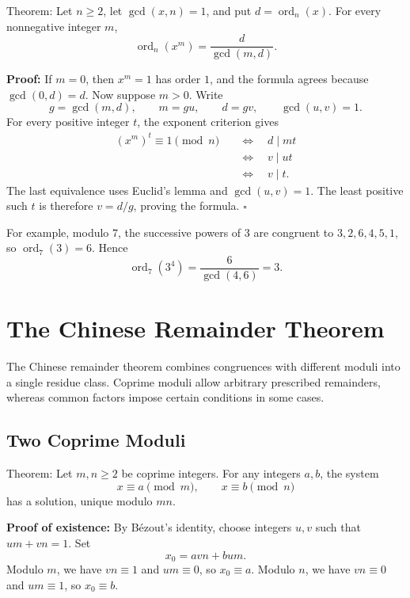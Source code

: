 \documentclass[a4paper,11pt,abstracton]{scrartcl}
\theoremstyle{dotlessP}
\theoremstyle{dotlessS}
\theoremstyle{remark}
\theoremstyle{definition}
\begin{document}
\begin{mainbox}{Theorem:}
Let $n\geq2$, let $\gcd(x,n)=1$, and put $d=\operatorname{ord}_n(x)$.
For every nonnegative integer $m$,
\[
    \boxed{\operatorname{ord}_n(x^m)=\frac{d}{\gcd(m,d)}.}
\]
\end{mainbox}

\textbf{Proof:}
If $m=0$, then $x^m=1$ has order $1$, and the formula agrees because
$\gcd(0,d)=d$. Now suppose $m>0$. Write
\[
    g=\gcd(m,d),\qquad m=gu,\qquad d=gv,
    \qquad\gcd(u,v)=1.
\]
For every positive integer $t$, the exponent criterion gives
\begin{align*}
    (x^m)^t\equiv1\pmod n
    &\quad\Longleftrightarrow\quad d\mid mt\\
    &\quad\Longleftrightarrow\quad v\mid ut\\
    &\quad\Longleftrightarrow\quad v\mid t.
\end{align*}
The last equivalence uses Euclid's lemma and $\gcd(u,v)=1$.
The least positive such $t$ is therefore $v=d/g$, proving the formula.
\hfill$\square$



\begin{example_box}
For example, modulo $7$, the successive powers of $3$ are congruent to
$3,2,6,4,5,1$, so $\operatorname{ord}_7(3)=6$. Hence
\[
    \operatorname{ord}_7(3^4)=\frac{6}{\gcd(4,6)}=3.
\]
\end{example_box}


\section{The Chinese Remainder Theorem}

The Chinese remainder theorem combines congruences with different
moduli into a single residue class. Coprime moduli allow arbitrary
prescribed remainders, whereas common factors impose certain conditions in some cases.

\subsection{Two Coprime Moduli}

\begin{mainbox}{Theorem:}
Let $m,n\geq2$ be coprime integers. For any integers $a,b$, the system
\[
    x\equiv a\pmod m,\qquad x\equiv b\pmod n
\]
has a solution, unique modulo $mn$.
\end{mainbox}

\textbf{Proof of existence:}
By B\'ezout's identity, choose integers $u,v$ such that
$um+vn=1$. Set
\[
    x_0=avn+bum.
\]
Modulo $m$, we have $vn\equiv1$ and $um\equiv0$, so $x_0\equiv a$.
Modulo $n$, we have $vn\equiv0$ and $um\equiv1$, so $x_0\equiv b$.
\end{document}
